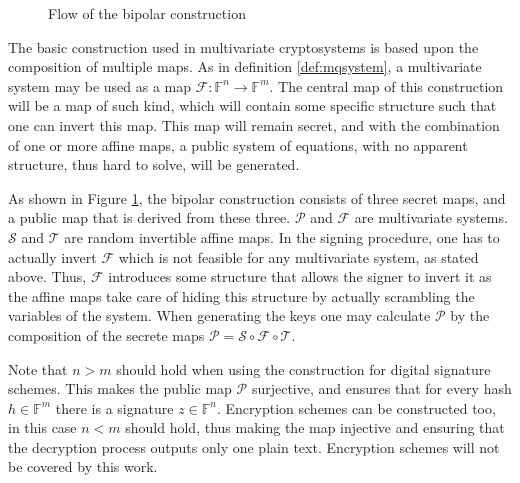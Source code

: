 \documentclass{ufsctex/ufsctex}
\begin{document}
\begin{figure}
\centering
{}
\caption{Flow of the bipolar construction}\label{fig:bipolar}
\end{figure}

The basic construction used in multivariate cryptosystems is based upon the
composition of multiple maps. As in definition \ref{def:mqsystem}, a
multivariate system may be used as a map
$\mathcal{F}:\mathbb{F}^n\to\mathbb{F}^m$. The central map of this construction
will be a map of such kind, which will contain some specific structure such
that one can invert this map. This map will remain secret, and with the
combination of one or more affine maps, a public system of equations, with no
apparent structure, thus hard to solve, will be generated.

As shown in Figure \ref{fig:bipolar}, the bipolar construction consists of
three secret maps, and a public map that is derived from these three.
$\mathcal{P}$ and $\mathcal{F}$ are multivariate systems. $\mathcal{S}$ and
$\mathcal{T}$ are random invertible affine maps. In the signing procedure, one
has to actually invert $\mathcal{F}$ which is not feasible for any multivariate
system, as stated above. Thus, $\mathcal{F}$ introduces some structure that
allows the signer to invert it as the affine maps take care of hiding this
structure by actually scrambling the variables of the system. When generating
the keys one may calculate $\mathcal{P}$ by the composition of the secrete maps
$\mathcal{P} = \mathcal{S} \circ \mathcal{F} \circ \mathcal{T}$.

Note that $n>m$ should hold when using the construction for digital signature
schemes. This makes the public map $\mathcal{P}$ surjective, and ensures that
for every hash $h \in \mathbb{F}^m$ there is a signature $z \in \mathbb{F}^n$.
Encryption schemes can be constructed too, in this case $n < m$ should hold,
thus making the map injective and ensuring that the decryption process outputs
only one plain text. Encryption schemes will not be covered by this work.
\end{document}
